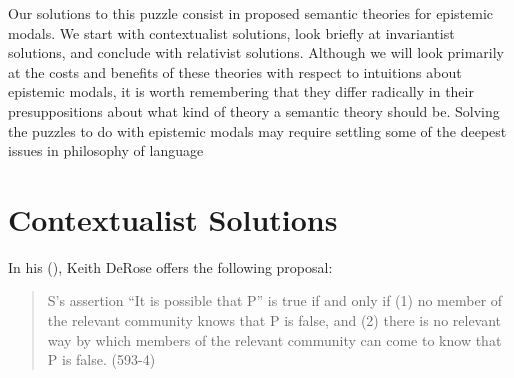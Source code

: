 \documentclass[
  11pt,
  letterpaper,
  DIV=11,
  numbers=noendperiod,
  twoside]{scrartcl}
\begin{document}
Our solutions to this puzzle consist in proposed semantic theories for
epistemic modals. We start with contextualist solutions, look briefly at
invariantist solutions, and conclude with relativist solutions. Although
we will look primarily at the costs and benefits of these theories with
respect to intuitions about epistemic modals, it is worth remembering
that they differ radically in their presuppositions about what kind of
theory a semantic theory should be. Solving the puzzles to do with
epistemic modals may require settling some of the deepest issues in
philosophy of language

\section{Contextualist Solutions}\label{contextualist-solutions}

In his (), Keith DeRose offers the
following proposal:

\begin{quote}
S's assertion ``It is possible that P'' is true if and only if (1) no
member of the relevant community knows that P is false, and (2) there is
no relevant way by which members of the relevant community can come to
know that P is false. (593-4)
\end{quote}
\end{document}
